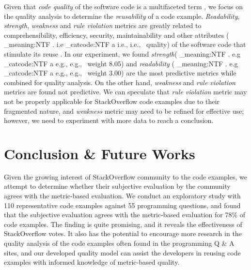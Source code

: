 \documentclass{sig-alternate}
\makeatletter
\newcommand\latinabbrev[1]{
  \peek_meaning:NTF . {%
    #1\@}%
  { \peek_catcode:NTF a {%
      #1., \@ }%
    {#1., \@}}}
\def\eg{\latinabbrev{e.g}}
\def\ie{\latinabbrev{i.e}}
\makeatother
\begin{document}
Given that \emph{code quality} of the software code is a multifaceted term \cite{survey}, we focus on the quality analysis to determine the \emph{reusability} of a code example. \emph{Readability}, \emph{strength}, \emph{weakness} and \emph{rule violation} metrics are greatly related to comprehensibility, efficiency, security, maintainability and other attributes (\ie\ quality) of the software code that stimulate its reuse \cite{readability}. In our experiment, we found \emph{strength}(\eg\ weight 8.05) and \emph{readability} (\eg\ weight 3.00) are the most predictive metrics while combined for quality analysis. On the other hand, \emph{weakness} and \emph{rule violation} metrics are found not predictive. We can speculate that \emph{rule violation} metric may not be properly applicable for StackOverflow code examples due to their fragmented nature, and \emph{weakness} metric may need to be refined for effective use; however, we need to experiment with more data to reach a conclusion.  
\vspace{-.2cm}
\section{Conclusion \& Future Works\vspace{-.1cm}}
\label{sec:conclusion}
Given the growing interest of StackOverflow community to the code examples, we attempt to determine whether their subjective evaluation by the community agrees with the metric-based evaluation. We conduct an exploratory study with 110 representative code examples against 55 programming questions, and found that the subjective evaluation agrees with the metric-based evaluation for 78\% of code examples. The finding is quite promising, and it reveals the effectiveness of StackOverflow votes. It also has the potential to encourage more research in the quality analysis of the code examples often found in the programming Q \& A sites, and our developed quality model can assist the developers in reusing code examples with informed knowledge of metric-based quality. 
\vspace{-.2cm}


\setlength{\bibsep}{0pt plus 0.3ex}
\scriptsize
%
%
\end{document}
